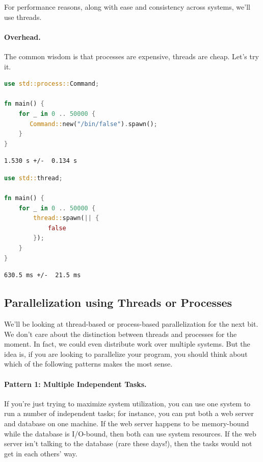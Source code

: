 \documentclass[a4paper]{report}
\begin{document}
For performance reasons, along with ease and consistency across systems, we'll use threads.

\paragraph{Overhead.} The common wisdom is that processes are
expensive, threads are cheap. Let's try it.

\begin{multicols}{2}

\begin{lstlisting}[language=Rust]
use std::process::Command;

fn main() {
    for _ in 0 .. 50000 {
       Command::new("/bin/false").spawn();
    }
}
\end{lstlisting}
\begin{verbatim}
1.530 s +/-  0.134 s
\end{verbatim}
\columnbreak
\begin{lstlisting}[language=Rust]
use std::thread;

fn main() {
    for _ in 0 .. 50000 {
        thread::spawn(|| {
            false
        });
    }
}
\end{lstlisting}
\begin{verbatim}
630.5 ms +/-  21.5 ms 
\end{verbatim}

\end{multicols}

\subsection*{Parallelization using Threads or Processes}
We'll be looking at thread-based or process-based parallelization for the
next bit. We don't care about the distinction between threads and processes
for the moment. In fact, we could even distribute work over multiple systems. But the idea is, if you are looking to parallelize your program, you should think about which of the following patterns makes the most sense.

\paragraph{Pattern 1: Multiple Independent Tasks.} If you're just trying to maximize
system utilization, you can use one system to run a number of independent
tasks; for instance, you can put both a web server and database on
one machine. If the web server happens to be memory-bound while the
database is I/O-bound, then both can use system resources. If the web
server isn't talking to the database (rare these days!), then the tasks
would not get in each others' way.
\end{document}
